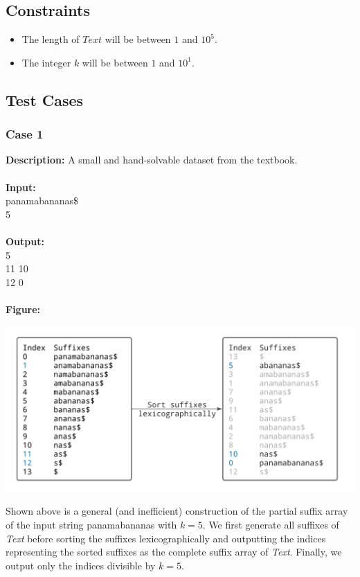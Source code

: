 \documentclass{article}
\newcommand{\code}[1]{{\fontfamily{pcr}\selectfont #1}}
\begin{document}
\subsection*{Constraints}
\begin{itemize}
    \item The length of $Text$ will be between $1$ and $10^5$.
    \item The integer $k$ will be between $1$ and $10^1$.
\end{itemize}
\pagebreak

\subsection*{Test Cases}
\subsubsection*{Case 1}
\hline \vspace{5}
\textbf{Description:} A small and hand-solvable dataset from the textbook.\\ \\
\noindent \textbf{Input:}\\
\code{panamabananas\$\\ 5}\\ \\
\noindent \textbf{Output:}\\
\code{1 5\\ 11 10\\ 12 0}\\ \\
\noindent \textbf{Figure:}
\begin{center}
    \includegraphics[scale=0.16]{c9/figures/9Q.png}
\end{center}
\noindent Shown above is a general (and inefficient) construction of the partial suffix array of the input string \code{panamabananas} with $k=5$. We first generate all suffixes of \emph{Text} before sorting the suffixes lexicographically and outputting the indices representing the sorted suffixes as the complete suffix array of \emph{Text}. Finally, we output only the indices divisible by $k=5$.
\pagebreak
\end{document}

